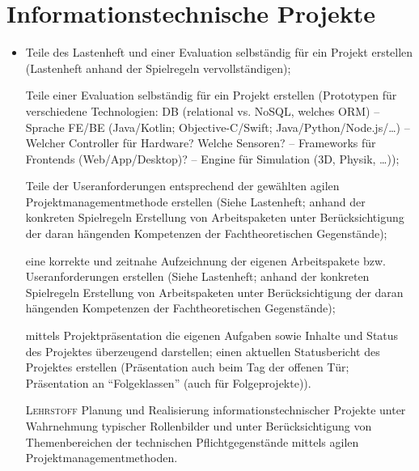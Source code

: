 \section{Informationstechnische Projekte}

\begin{itemize}[label={-}]
    \item Teile des Lastenheft und einer Evaluation selbständig für ein Projekt erstellen
        {\color{red}(Lastenheft anhand der Spielregeln vervollständigen)};
    \item[] Teile einer Evaluation selbständig für ein Projekt erstellen
        {\color{red}(Prototypen für verschiedene Technologien: DB (relational vs. NoSQL, welches ORM) -- Sprache FE/BE (Java/Kotlin; Objective-C/Swift; Java/Python/Node.js/\dots) -- Welcher Controller für Hardware? Welche Sensoren? -- Frameworks für Frontends (Web/App/Desktop)? -- Engine für Simulation (3D, Physik, \dots))};
    \item[] Teile der Useranforderungen entsprechend der gewählten agilen Projektmanagementmethode erstellen
        {\color{red}(Siehe Lastenheft; anhand der konkreten Spielregeln Erstellung von Arbeitspaketen unter Berücksichtigung der daran hängenden Kompetenzen der Fachtheoretischen Gegenstände)};
    \item[] eine korrekte und zeitnahe Aufzeichnung der eigenen Arbeitspakete bzw. Useranforderungen erstellen
        {\color{red}(Siehe Lastenheft; anhand der konkreten Spielregeln Erstellung von Arbeitspaketen unter Berücksichtigung der daran hängenden Kompetenzen der Fachtheoretischen Gegenstände)};
    \item[] mittels Projektpräsentation die eigenen Aufgaben sowie Inhalte und Status des Projektes überzeugend darstellen; einen aktuellen Statusbericht des Projektes erstellen
        {\color{red}(Präsentation auch beim Tag der offenen Tür; Präsentation an \enquote{Folgeklassen} (auch für Folgeprojekte))}.
    \item[\tiny\textsc{Lehrstoff}] Planung und Realisierung informationstechnischer Projekte unter Wahrnehmung typischer Rollenbilder und unter Berücksichtigung von Themenbereichen der technischen Pflichtgegenstände mittels agilen Projektmanagementmethoden.
\end{itemize}

